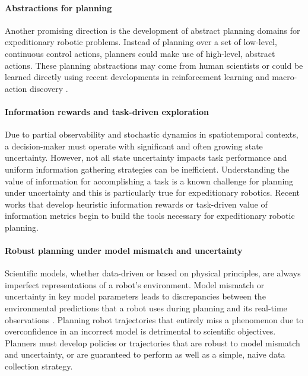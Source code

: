 \paragraph{Abstractions for planning}
Another promising direction is the development of abstract planning domains for expeditionary robotic problems. Instead of planning over a set of low-level, continuous control actions, planners could make use of high-level, abstract actions. These planning abstractions may come from human scientists or could be learned directly using recent developments in reinforcement learning and macro-action discovery \autocite{liu2017learning}.

\paragraph{Information rewards and task-driven exploration}
Due to partial observability and stochastic dynamics in spatiotemporal contexts, a decision-maker must operate with significant and often growing state uncertainty. However, not all state uncertainty impacts task performance and uniform information gathering strategies can be inefficient. Understanding the value of information for accomplishing a task is a known challenge for planning under uncertainty and this is particularly true for expeditionary robotics. Recent works that develop heuristic information rewards \autocite{flaspohler2019information} or task-driven value of information metrics \autocite{flaspohler2020belief} begin to build the tools necessary for expeditionary robotic planning.

\paragraph{Robust planning under model mismatch and uncertainty}
Scientific models, whether data-driven or based on physical principles, are always imperfect representations of a robot's environment. Model mismatch or uncertainty in key model parameters leads to discrepancies between the environmental predictions that a robot uses during planning and its real-time observations \autocite{singh2018robust}. Planning robot trajectories that entirely miss a phenomenon due to overconfidence in an incorrect model is detrimental to scientific objectives. Planners must develop policies or trajectories that are robust to model mismatch and uncertainty, or are guaranteed to perform as well as a simple, naive data collection strategy. 

